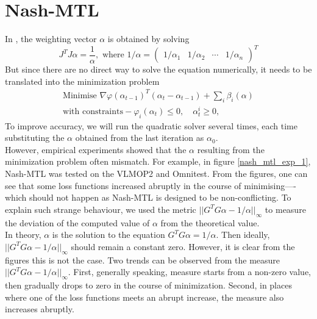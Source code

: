 \documentclass{article}
\newcommand{\mat}[1]{\begin{pmatrix}#1\end{pmatrix}}
\renewcommand{\|}{\biggr|}
\begin{document}
    \section{Nash-MTL}
    In , the weighting vector $\alpha$ is obtained by solving 
    \begin{equation*}
        J^TJ\alpha = \frac{1}{\alpha}, \text{ where } 1/\alpha = \mat{1/\alpha_1 & 1/\alpha_2 & \cdots & 1/\alpha_n}^T
    \end{equation*}
    But since there are no direct way to solve the equation numerically, it needs to be translated into the minimization problem 
    \begin{gather*}
        \text{Minimise } \nabla \varphi(\alpha_{t-1})^T (\alpha_t - \alpha_{t-1}) + \sum_i \beta_i(\alpha)\tag{$\star$}\\
        \text{with constraints}
            -\varphi_i(\alpha_t) \leq 0, \quad \alpha_t^i \geq 0,
    \end{gather*}
    To improve accuracy, we will run the quadratic solver several times, each time substituting the $\alpha$ obtained from the last iteration as $\alpha_0$.\\
    However, empirical experiments showed that the $\alpha$ resulting from the minimization problem often mismatch. For example, in figure \ref{nash_mtl_exp_1}, Nash-MTL was tested on the VLMOP2 and Omnitest. From the figures, one can see that some loss functions increased abruptly in the course of minimising----which should not happen as Nash-MTL is designed to be non-conflicting. To explain such strange behaviour, we used the metric $||G^TG \alpha - 1/\alpha||_\infty$ to measure the deviation of the computed value of $\alpha$ from the theoretical value.\\

    In theory, $\alpha$ is the solution to the equation $G^T G \alpha = 1/\alpha$. Then ideally, $||G^TG \alpha - 1/\alpha||_\infty$ should remain a constant zero. However, it is clear from the figures this is not the case. Two trends can be observed from the measure $||G^T G \alpha - 1/\alpha||_\infty$. First, generally speaking, measure starts from a non-zero value, then gradually drops to zero in the course of minimization. Second, in places where one of the loss functions meets an abrupt increase, the measure also increases abruptly.\\
\end{document}
